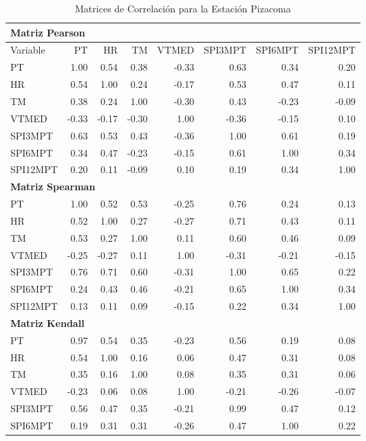 \begin{table}[ht]
\centering
\caption{Matrices de Correlación para la Estación Pizacoma}
\begin{tabular}{lrrrrrrr}
\toprule
\multicolumn{8}{l}{\textbf{Matriz Pearson}} \\
\midrule
Variable & PT & HR & TM & VTMED & SPI3MPT & SPI6MPT & SPI12MPT \\
\midrule
PT       & 1.00 & 0.54 & 0.38 & -0.33 & 0.63 & 0.34 & 0.20 \\
HR       & 0.54 & 1.00 & 0.24 & -0.17 & 0.53 & 0.47 & 0.11 \\
TM       & 0.38 & 0.24 & 1.00 & -0.30 & 0.43 & -0.23 & -0.09 \\
VTMED    & -0.33 & -0.17 & -0.30 & 1.00 & -0.36 & -0.15 & 0.10 \\
SPI3MPT  & 0.63 & 0.53 & 0.43 & -0.36 & 1.00 & 0.61 & 0.19 \\
SPI6MPT  & 0.34 & 0.47 & -0.23 & -0.15 & 0.61 & 1.00 & 0.34 \\
SPI12MPT & 0.20 & 0.11 & -0.09 & 0.10 & 0.19 & 0.34 & 1.00 \\
\midrule
\multicolumn{8}{l}{\textbf{Matriz Spearman}} \\
\midrule
PT       & 1.00 & 0.52 & 0.53 & -0.25 & 0.76 & 0.24 & 0.13 \\
HR       & 0.52 & 1.00 & 0.27 & -0.27 & 0.71 & 0.43 & 0.11 \\
TM       & 0.53 & 0.27 & 1.00 & 0.11 & 0.60 & 0.46 & 0.09 \\
VTMED    & -0.25 & -0.27 & 0.11 & 1.00 & -0.31 & -0.21 & -0.15 \\
SPI3MPT  & 0.76 & 0.71 & 0.60 & -0.31 & 1.00 & 0.65 & 0.22 \\
SPI6MPT  & 0.24 & 0.43 & 0.46 & -0.21 & 0.65 & 1.00 & 0.34 \\
SPI12MPT & 0.13 & 0.11 & 0.09 & -0.15 & 0.22 & 0.34 & 1.00 \\
\midrule
\multicolumn{8}{l}{\textbf{Matriz Kendall}} \\
\midrule
PT       & 0.97 & 0.54 & 0.35 & -0.23 & 0.56 & 0.19 & 0.08 \\
HR       & 0.54 & 1.00 & 0.16 & 0.06 & 0.47 & 0.31 & 0.08 \\
TM       & 0.35 & 0.16 & 1.00 & 0.08 & 0.35 & 0.31 & 0.06 \\
VTMED    & -0.23 & 0.06 & 0.08 & 1.00 & -0.21 & -0.26 & -0.07 \\
SPI3MPT  & 0.56 & 0.47 & 0.35 & -0.21 & 0.99 & 0.47 & 0.12 \\
SPI6MPT  & 0.19 & 0.31 & 0.31 & -0.26 & 0.47 & 1.00 & 0.22 \\

\end{tabular}
\end{table}
